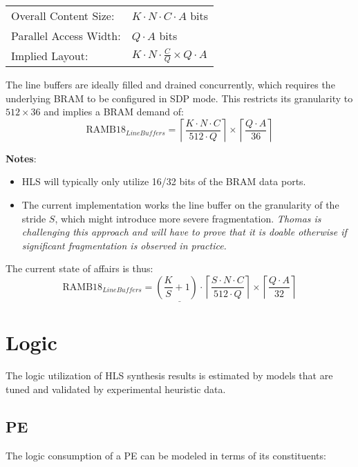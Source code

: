 \documentclass[DIV12]{scrreprt}
\begin{document}
\begin{center}
\begin{tabular}{ll}\toprule
  Overall Content Size:  & $K\cdot N\cdot C\cdot A$ bits\\
  Parallel Access Width: & $Q\cdot A$ bits\\
  Implied Layout:        & $K\cdot N\cdot\frac{C}{Q}\times Q\cdot A$\\\bottomrule
\end{tabular}
\end{center}

The line buffers are ideally filled and drained concurrently, which
requires the underlying BRAM to be configured in SDP mode. This
restricts its granularity to $512\times 36$ and implies a BRAM demand of:
\[\mbox{RAMB18}_{Line Buffers} =
  \left\lceil\frac{K\cdot N\cdot C}{512\cdot Q}\right\rceil\times
  \left\lceil\frac{Q\cdot A}{36}\right\rceil\]

\textbf{Notes}:
\begin{itemize}
\item
  HLS will typically only utilize 16/32 bits of the BRAM data ports.
\item
  The current implementation works the line buffer on the granularity
  of the stride $S$, which might introduce more severe fragmentation.\newline
  \emph{
    Thomas is challenging this approach and will have to prove that
    it is doable otherwise if significant fragmentation is observed in
    practice.
  }
\end{itemize}

The current state of affairs is thus:
\[\underline{\mbox{RAMB18}_{Line Buffers} = \left(\frac{K}{S}+1\right)\cdot
  \left\lceil\frac{S\cdot N\cdot C}{512\cdot Q}\right\rceil\times
  \left\lceil\frac{Q\cdot A}{32}\right\rceil}\]

\section{Logic}
The logic utilization of HLS synthesis results is estimated by models
that are tuned and validated by experimental heuristic data.

\subsection{PE}
The logic consumption of a PE can be modeled in terms of its
constituents:
\end{document}
